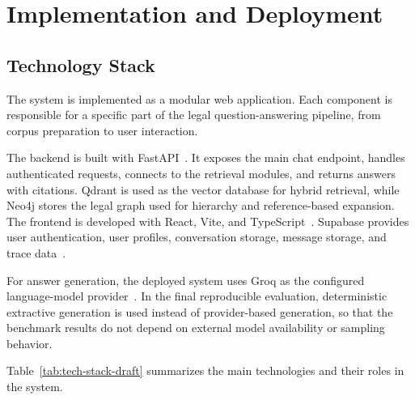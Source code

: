 \section{Implementation and Deployment}

\subsection{Technology Stack}

The system is implemented as a modular web application. Each component is responsible for a specific part of the legal question-answering pipeline, from corpus preparation to user interaction.

The backend is built with FastAPI~\cite{fastapidocs}. It exposes the main chat endpoint, handles authenticated requests, connects to the retrieval modules, and returns answers with citations. Qdrant is used as the vector database for hybrid retrieval, while Neo4j stores the legal graph used for hierarchy and reference-based expansion. The frontend is developed with React, Vite, and TypeScript~\cite{reactdocs,vitedocs}. Supabase provides user authentication, user profiles, conversation storage, message storage, and trace data~\cite{supabasedocs}.

For answer generation, the deployed system uses Groq as the configured language-model provider~\cite{groqdocs}. In the final reproducible evaluation, deterministic extractive generation is used instead of provider-based generation, so that the benchmark results do not depend on external model availability or sampling behavior.

Table~\ref{tab:tech-stack-draft} summarizes the main technologies and their roles in the system.

